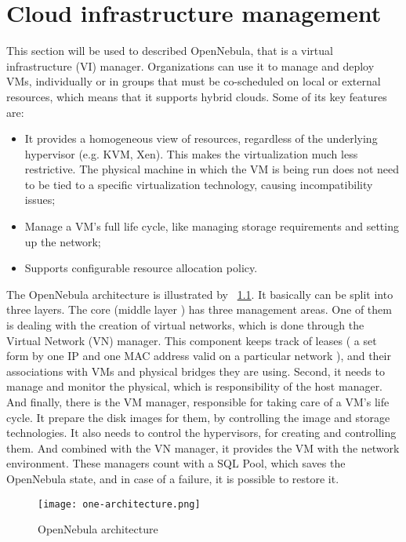 \chapter{\textbf{Cloud infrastructure management}}


This section will be used to described OpenNebula, that is a virtual infrastructure (VI) manager. Organizations can use it to manage and deploy VMs, individually or in groups that must be co-scheduled on local or external resources, which means that it supports hybrid clouds. Some of its key features are:
\begin{itemize}
 \item It provides a homogeneous view of resources, regardless of the underlying hypervisor (e.g. KVM, Xen). This makes the virtualization much less restrictive. The physical machine in which the VM is being run does not need to be tied to a specific virtualization technology, causing incompatibility issues;
  \item Manage a VM's full life cycle, like managing storage requirements and setting up the network;
  \item Supports configurable resource allocation policy.
\end{itemize}

The OpenNebula architecture is illustrated by ~\ref{fig:open_arch}. It basically can be split into three layers. The core (middle layer ) has three management areas. One of them is dealing with the creation of virtual networks, which is done through the Virtual Network (VN) manager. This component keeps track of leases ( a set form by one IP and one MAC address valid on a particular network ), and their associations with VMs and physical bridges they are using. Second, it needs to manage and monitor the physical, which is responsibility of the host manager. And finally, there is the VM manager, responsible for taking care of a VM's life cycle. It prepare the disk images for them, by controlling the image and storage technologies. It also needs to control the hypervisors, for creating and controlling them. And combined with the VN manager, it provides the VM with the network environment. These managers count with a SQL Pool, which saves the OpenNebula state, and in case of a failure, it is possible to restore it.

\begin{figure}[ht]
  \centering
 \texttt{[image: one-architecture.png]}
  \caption{OpenNebula architecture}
  \label{fig:open_arch}
\end{figure}

